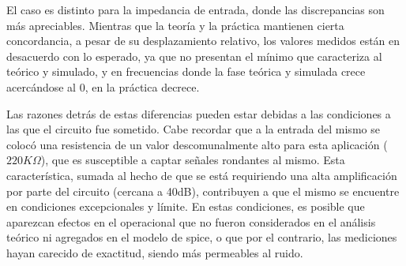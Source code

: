 El caso es distinto para la impedancia de entrada, donde las discrepancias son más apreciables.
Mientras que la teoría y la práctica mantienen cierta concordancia, a pesar de su desplazamiento relativo, los valores medidos están en desacuerdo con lo esperado, ya que no presentan el mínimo que caracteriza al teórico y simulado, y en frecuencias donde la fase teórica y simulada crece acercándose al 0, en la práctica decrece. \par
Las razones detrás de estas diferencias pueden estar debidas a las condiciones a las que el circuito fue sometido.
Cabe recordar que a la entrada del mismo se colocó una resistencia de un valor descomunalmente alto para esta aplicación ($220K\Omega$), que es susceptible a captar señales rondantes al mismo.
Esta característica, sumada al hecho de que se está requiriendo una alta amplificación por parte del circuito (cercana a 40dB), contribuyen a que el mismo se encuentre en condiciones excepcionales y límite.
En estas condiciones, es posible que aparezcan efectos en el operacional que no fueron considerados en el análisis teórico ni agregados en el modelo de spice, o que por el contrario, las mediciones hayan carecido de exactitud, siendo más permeables al ruido.



